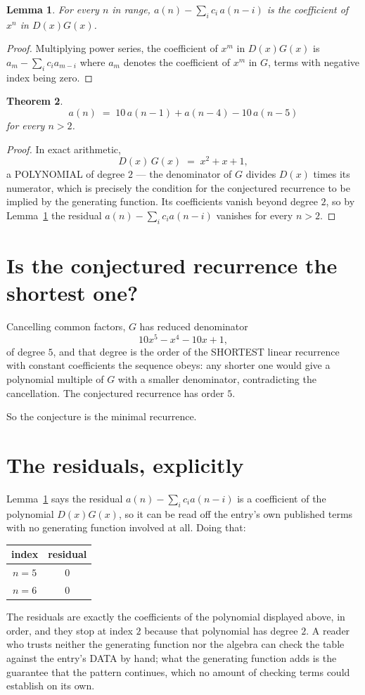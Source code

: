 \documentclass[11pt,a4paper]{article}
\theoremstyle{plain}
\newtheorem{theorem}{Theorem}
\newtheorem{lemma}[theorem]{Lemma}
\theoremstyle{definition}
\begin{document}
\begin{lemma}\label{lem:key}
For every $n$ in range, $a(n)-\sum_i c_i\,a(n-i)$ is the coefficient of $x^{n}$ in
$D(x)G(x)$.
\end{lemma}

\begin{proof}
Multiplying power series, the coefficient of $x^{m}$ in $D(x)G(x)$ is
$a_m-\sum_i c_i a_{m-i}$ where $a_m$ denotes the coefficient of $x^{m}$ in $G$, terms with
negative index being zero.
\end{proof}

\begin{theorem}
\[
a(n)\;=\;10\,a(n-1) + a(n-4) - 10\,a(n-5)
\]
for every $n>2$.
\end{theorem}

\begin{proof}
In exact arithmetic,
\[
D(x)\,G(x)\;=\;x^{2} + x + 1,
\]
a POLYNOMIAL of degree $2$ --- the denominator of $G$ divides $D(x)$ times its numerator,
which is precisely the condition for the conjectured recurrence to be implied by the
generating function. Its coefficients vanish beyond degree $2$, so by
Lemma~\ref{lem:key} the residual $a(n)-\sum_ic_ia(n-i)$ vanishes for every
$n>2$.
\end{proof}

\section{Is the conjectured recurrence the shortest one?}

Cancelling common factors, $G$ has reduced denominator
\[
10 x^{5} - x^{4} - 10 x + 1,
\]
of degree $5$, and that degree is the order of the SHORTEST linear recurrence with
constant coefficients the sequence obeys: any shorter one would give a polynomial multiple of
$G$ with a smaller denominator, contradicting the cancellation. The conjectured recurrence has
order $5$.

So the conjecture is the minimal recurrence.

\section{The residuals, explicitly}

Lemma~\ref{lem:key} says the residual $a(n)-\sum_ic_ia(n-i)$ is a coefficient of the
polynomial $D(x)G(x)$, so it can be read off the entry's own published terms with no
generating function involved at all. Doing that:
\begin{center}
\begin{tabular}{cc}
index & residual \\ \hline
$n=5$ & $0$ \\
$n=6$ & $0$
\end{tabular}
\end{center}
The residuals are exactly the coefficients of the polynomial displayed above, in order, and
they stop at index $2$ because that polynomial has degree $2$. A reader who trusts
neither the generating function nor the algebra can check the table against the entry's DATA
by hand; what the generating function adds is the guarantee that the pattern continues, which
no amount of checking terms could establish on its own.
\end{document}
